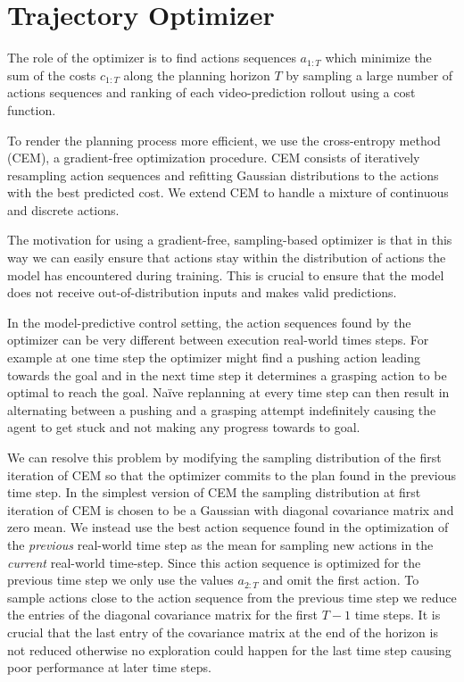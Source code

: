 \section{Trajectory Optimizer}
\label{sec:optimizer}
The role of the optimizer is to find actions sequences $a_{1:T}$ which minimize the sum of the costs $c_{1:T}$ along the planning horizon $T$ by sampling a large number of actions sequences and ranking of each video-prediction rollout using a cost function.

To render the planning process more efficient, we use the cross-entropy method (CEM), a gradient-free optimization procedure.
CEM consists of iteratively resampling action sequences and refitting Gaussian distributions to the actions with the best predicted cost. 
We extend CEM to handle a mixture of continuous and discrete actions.

The motivation for using a gradient-free, sampling-based optimizer is that in this way we can easily ensure that actions stay within the distribution of actions the model has encountered during training. This is crucial to ensure that the model does not receive out-of-distribution inputs and makes valid predictions. 

In the model-predictive control setting, the action sequences found by the optimizer can be very different between execution real-world times steps. For example at one time step the optimizer might find a pushing action leading towards the goal and in the next time step it determines a grasping action to be optimal to reach the goal. Na\"{i}ve replanning at every time step can then result in alternating between a pushing and a grasping attempt indefinitely causing the agent to get stuck and not making any progress towards to goal. 

We can resolve this problem by modifying the sampling distribution of the first iteration of CEM so that the optimizer commits to the plan found in the previous time step. In the simplest version of CEM the sampling distribution at first iteration of CEM is chosen to be a Gaussian with diagonal covariance matrix and zero mean. We instead use the best action sequence found in the optimization of the \emph{previous} real-world time step as the mean for sampling new actions in the \emph{current} real-world time-step. Since this action sequence is optimized for the previous time step we only use the values $a_{2:T}$ and omit the first action. To sample actions close to the action sequence from the previous time step we reduce the entries of the diagonal covariance matrix for the first $T-1$ time steps. It is crucial that the last entry of the covariance matrix at the end of the horizon is not reduced otherwise no exploration could happen for the last time step causing poor performance at later time steps.